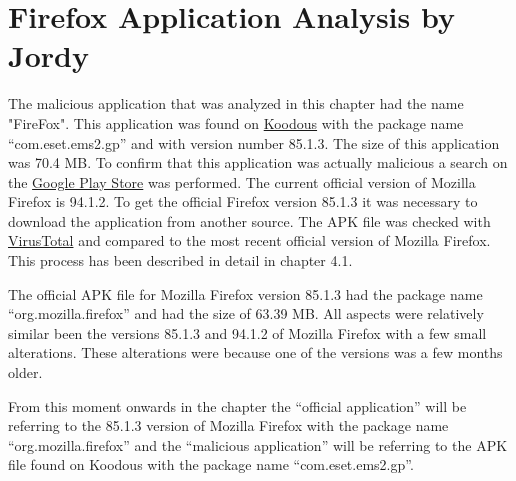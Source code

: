 \section{Firefox Application Analysis by Jordy}
The malicious application that was analyzed in this chapter had the name "FireFox".
This application was found on \href{https://koodous.com/apks/26a7576cc1182bf90fb16c3320d12a736b3faa10c158755605f36daae4b197b7}{Koodous} with the package name “com.eset.ems2.gp” and with version number 85.1.3.
The size of this application was 70.4 MB.
To confirm that this application was actually malicious a search on the \href{https://play.google.com/store/apps/details?id=org.mozilla.firefox&hl=nl&gl=US}{Google Play Store} was performed.
The current official version of Mozilla Firefox is 94.1.2.
To get the official Firefox version 85.1.3 it was necessary to download the application from another source.
The APK file was checked with \href{https://www.virustotal.com/gui/file/59ce0f9ea256b4576f391d01c685ced2db224a252bf09c3f362e6859a6c7ead5/details}{VirusTotal} and compared to the most recent official version of Mozilla Firefox.
This process has been described in detail in chapter 4.1.

The official APK file for Mozilla Firefox version 85.1.3 had the package name “org.mozilla.firefox” and had the size of 63.39 MB.
All aspects were relatively similar been the versions 85.1.3 and 94.1.2 of Mozilla Firefox with a few small alterations.
These alterations were because one of the versions was a few months older.

From this moment onwards in the chapter the “official application” will be referring to the 85.1.3 version of Mozilla Firefox with the package name “org.mozilla.firefox” and the “malicious application” will be referring to the APK file found on Koodous with the package name “com.eset.ems2.gp”.